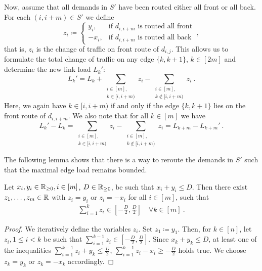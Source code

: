 Now, assume that all demands in $S'$ have been routed either all front or all back.
For each $(i, i+m) \in S'$ we define
\begin{equation}
	z_i \coloneqq \begin{cases}
		y_i, &\text{if } d_{i, i+m} \text{ is routed all front} \\
		-x_i, &\text{if } d_{i, i+m} \text{ is routed all back}
	\end{cases} \ ,
\end{equation}
that is, $z_i$ is the change of traffic on front route of $d_{i, j}$.
This allows us to formulate the total change of traffic on any edge $\{k, k+1\}$, $k \in [2m]$ and determine the new link load $L_k'$:
\begin{equation}
	\label{eq:load-change}
	L_k' = L_k + \sum_{\substack{i \in [m],\\ k \in [i, i+m)}} z_i - \sum_{\substack{i \in [m],\\ k \notin[i, i+m)}} z_i \ .
\end{equation}
Here, we again have $k \in [i, i+m)$ if and only if the edge $\{k,k+1\}$ lies on the front route of $d_{i, i+m}$.
We also note that for all $k \in [m]$ we have
\begin{equation}
	\label{eq:load-increase-equality}
	L_k' - L_k 
	= \sum_{\substack{i \in [m],\\ k \in [i, i+m)}} z_i - \sum_{\substack{i \in [m],\\ k \notin[i, i+m)}} z_i 
	= L_{k + m} - L_{k + m}' \ .
\end{equation}

The following lemma shows that there is a way to reroute the demands in $S'$ such that the maximal edge load remains bounded.
\begin{lemma}
	\label{lemma:reroute-demands}
	Let $x_i, y_i \in \mathbb{R}_{\geq 0}, i \in [m]$, $D \in \mathbb{R}_{\geq 0}$, be such that $x_i + y_i \leq D$.
	Then there exist $z_1, \dots, z_m \in \mathbb{R}$ with $z_i = y_i$ or $z_i = -x_i$ for all $i \in [m]$, such that
	\begin{align}
		\sum_{i=1}^k z_i \in \left[-\frac{D}{2}, \frac{D}{2}\right] \quad \forall k \in [m] \ .
	\end{align}
\end{lemma}
\begin{proof}
	We iteratively define the variables $z_i$.
	Set $z_1 \coloneqq y_1$.
	Then, for $k \in [n]$, let $z_i, 1 \leq i < k$ be such that $\sum_{i=1}^{k-1} z_i \in \left[-\frac{D}{2}, \frac{D}{2}\right]$.
	Since $x_k + y_k \leq D$, at least one of the inequalities $\sum_{i=1}^{k-1} z_i + y_k \leq \frac{D}{2}$, $\sum_{i=1}^{k-1} z_i - x_i \geq -\frac{D}{2}$ holds true.
	We choose $z_k = y_k$ or $z_k = -x_k$ accordingly.	
\end{proof}

